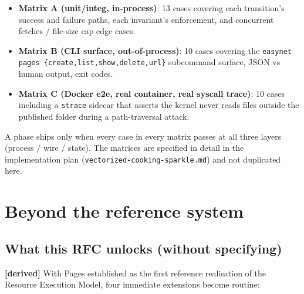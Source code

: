 \documentclass[11pt,a4paper]{article}
\newcommand{\derived}{\textcolor{derivedcolor}{\textbf{[derived]}}\xspace}
\theoremstyle{definition}
\begin{document}
\begin{itemize}[leftmargin=2em,itemsep=0.15em]
    \item \textbf{Matrix A (unit/integ, in-process)}: 13 cases
    covering each transition's success and failure paths,
    each invariant's enforcement, and concurrent fetches /
    file-size cap edge cases.
    \item \textbf{Matrix B (CLI surface, out-of-process)}: 10
    cases covering the \texttt{easynet pages
    \{create,list,show,delete,url\}} subcommand surface, JSON
    vs human output, exit codes.
    \item \textbf{Matrix C (Docker e2e, real container, real
    syscall trace)}: 10 cases including a \texttt{strace}
    sidecar that asserts the kernel never reads files outside
    the published folder during a path-traversal attack.
\end{itemize}

A phase ships only when every case in every matrix passes at
all three layers (process / wire / state). The matrices are
specified in detail in the implementation plan
(\texttt{vectorized-cooking-sparkle.md}) and not duplicated
here.

\section{Beyond the reference system}
\label{sec:beyond}

\subsection{What this RFC unlocks (without specifying)}

\derived{} With Pages established as the first reference
realisation of the Resource Execution Model, four immediate
extensions become routine:
\end{document}
